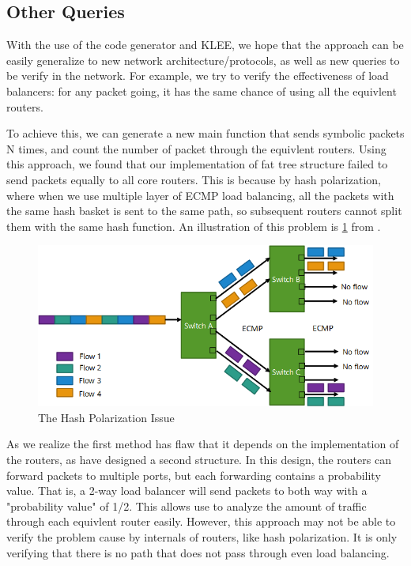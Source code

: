 \documentclass[letterpaper, 10 pt, conference]{ieeeconf}  %
\begin{document}
\subsection{Other Queries}

With the use of the code generator and KLEE, we hope that the approach can be easily generalize to new network architecture/protocols, as well as new queries to be verify in the network. 
For example, we try to verify the effectiveness of load balancers: for any packet going, it has the same chance of using all the equivlent routers. 

To achieve this, we can generate a new main function that sends symbolic packets N times, and count the number of packet through the equivlent routers. 
Using this approach, we found that our implementation of fat tree structure failed to send packets equally to all core routers. 
This is because by hash polarization, where when we use multiple layer of ECMP load balancing, all the packets with the same hash basket is sent to the same path, so subsequent routers cannot split them with the same hash function. 
An illustration of this problem is \ref{fig:hash_polar} from \cite{huawei-hash}.

\begin{figure}[]
  \centering
  \includegraphics[width=\linewidth]{hash-polar.png}
  \caption{The Hash Polarization Issue}
  \label{fig:hash_polar}
\end{figure}

As we realize the first method has flaw that it depends on the implementation of the routers, as have designed a second structure. 
In this design, the routers can forward packets to multiple ports, but each forwarding contains a probability value. 
That is, a 2-way load balancer will send packets to both way with a "probability value" of 1/2. 
This allows use to analyze the amount of traffic through each equivlent router easily. 
However, this approach may not be able to verify the problem cause by internals of routers, like hash polarization. 
It is only verifying that there is no path that does not pass through even load balancing. 
\end{document}
